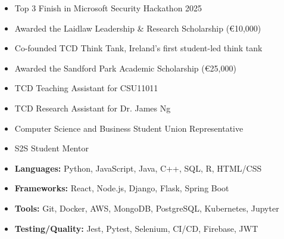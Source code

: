 \documentclass[10pt,a4paper]{article}
\begin{document}
\begin{minipage}[t]{0.60\textwidth}
\begin{itemize}
\item Top 3 Finish in Microsoft Security Hackathon 2025
\item Awarded the Laidlaw Leadership \& Research Scholarship (€10,000)
\item Co-founded TCD Think Tank, Ireland's first student-led think tank
\item Awarded the Sandford Park Academic Scholarship (€25,000)
\item TCD Teaching Assistant for CSU11011
\item TCD Research Assistant for Dr. James Ng
\item Computer Science and Business Student Union Representative
\item S2S Student Mentor
\end{itemize}
\end{minipage}
\hfill
\begin{minipage}[t]{0.40\textwidth}
\begin{itemize}
\item \textbf{Languages:} Python, JavaScript, Java, C++, SQL, R, HTML/CSS
\item \textbf{Frameworks:} React, Node.js, Django, Flask, Spring Boot
\item \textbf{Tools:} Git, Docker, AWS, MongoDB, PostgreSQL, Kubernetes, Jupyter
\item \textbf{Testing/Quality:} Jest, Pytest, Selenium, CI/CD, Firebase, JWT
\end{itemize}
\end{minipage}
\end{document}

